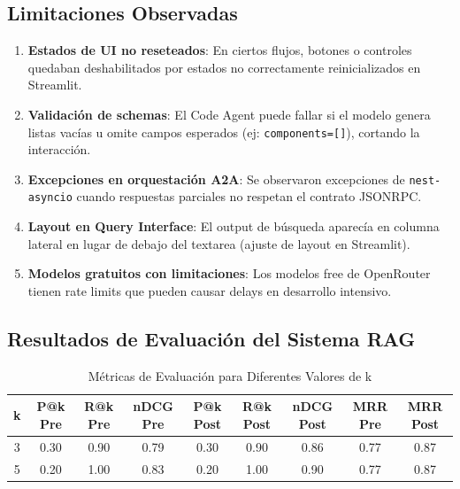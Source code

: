 \documentclass[12pt,a4paper]{article}
\begin{document}
\subsection{Limitaciones Observadas}

\begin{enumerate}
    \item \textbf{Estados de UI no reseteados}: En ciertos flujos, botones o controles quedaban deshabilitados por estados no correctamente reinicializados en Streamlit.
    
    \item \textbf{Validación de schemas}: El Code Agent puede fallar si el modelo genera listas vacías u omite campos esperados (ej: \texttt{components=[]}), cortando la interacción.
    
    \item \textbf{Excepciones en orquestación A2A}: Se observaron excepciones de \texttt{nest-asyncio} cuando respuestas parciales no respetan el contrato JSONRPC.
    
    \item \textbf{Layout en Query Interface}: El output de búsqueda aparecía en columna lateral en lugar de debajo del textarea (ajuste de layout en Streamlit).
    
    \item \textbf{Modelos gratuitos con limitaciones}: Los modelos free de OpenRouter tienen rate limits que pueden causar delays en desarrollo intensivo.
\end{enumerate}

\subsection{Resultados de Evaluación del Sistema RAG}

\begin{table}[H]
\centering
\caption{Métricas de Evaluación para Diferentes Valores de k}
\label{tab:metricas}
\begingroup
\footnotesize                 %
\setlength{\tabcolsep}{4pt}   %
\begin{adjustbox}{max width=\linewidth}
\begin{tabular}{@{}ccccccccc@{}}
\toprule
\textbf{k} & \textbf{P@k Pre} & \textbf{R@k Pre} & \textbf{nDCG Pre} & \textbf{P@k Post} & \textbf{R@k Post} & \textbf{nDCG Post} & \textbf{MRR Pre} & \textbf{MRR Post} \\
\midrule
3 & 0.30 & 0.90 & 0.79 & 0.30 & 0.90 & 0.86 & 0.77 & 0.87 \\
5 & 0.20 & 1.00 & 0.83 & 0.20 & 1.00 & 0.90 & 0.77 & 0.87 \\
\bottomrule
\end{tabular}
\end{adjustbox}
\endgroup
\end{table}
\end{document}
